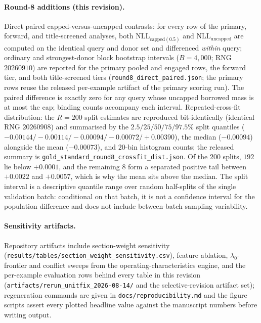 \documentclass[11pt]{article}
\begin{document}
\paragraph{Round-8 additions (this revision).} Direct paired
capped-versus-uncapped contrasts: for every row of the primary, forward,
and title-screened analyses, both $\mathrm{NLL}_{\mathrm{capped}(0.5)}$
and $\mathrm{NLL}_{\mathrm{uncapped}}$ are computed on the identical
query and donor set and differenced \emph{within} query; ordinary and
strongest-donor block bootstrap intervals ($B = 4{,}000$; RNG $20260910$)
are reported for the primary pooled and engaged rows, the forward tier,
and both title-screened tiers (\texttt{round8\_direct\_paired.json}; the
primary rows reuse the released per-example artifact of the primary
scoring run). The paired difference is exactly zero for any query whose
uncapped borrowed mass is at most the cap; binding counts accompany each
interval. Repeated-cross-fit distribution: the $R = 200$ split estimates
are reproduced bit-identically (identical RNG $20260908$) and summarised
by the $2.5/25/50/75/97.5\%$ split quantiles
($-0.00144/-0.00114/-0.00094/-0.00072/+0.00390$), the median
($-0.00094$) alongside the mean ($-0.00073$), and $20$-bin histogram
counts; the released summary is
\texttt{gold\_standard\_\allowbreak round8\_crossfit\_dist.json}. Of the
$200$ splits, $192$ lie below $+0.0001$, and the remaining $8$ form a
separated positive tail between $+0.0022$ and $+0.0057$, which is why
the mean sits above the median. The split interval is a descriptive
quantile range over random half-splits of the single validation batch:
conditional on that batch, it is not a confidence interval for the
population difference and does not include between-batch sampling
variability.

\paragraph{Sensitivity artifacts.} Repository artifacts include section-weight
sensitivity (\texttt{results/tables/\allowbreak section\_weight\_sensitivity.csv}),
feature ablation, $\lambda_0$-frontier and conflict sweeps from the
operating-characteristics engine, and the per-example evaluation rows behind
every table in this revision
(\texttt{artifacts/\allowbreak rerun\_unitfix\_2026-08-14/} and the selective-revision
artifact set); regeneration commands are given in
\texttt{docs/reproducibility.md} and the figure scripts assert every plotted
headline value against the manuscript numbers before writing output.
\end{document}
